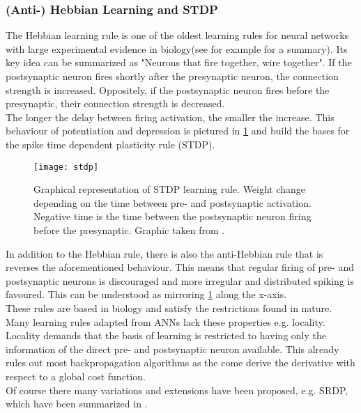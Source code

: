 \subsubsection{(Anti-) Hebbian Learning and STDP}
The Hebbian learning rule is one of the oldest learning rules for neural networks with large experimental evidence in biology(see for example \cite{feldman_spike-timing_2012} for a summary). Its key idea can be summarized as "Neurons that fire together, wire together". If the postsynaptic neuron fires shortly after the presynaptic neuron, the connection strength is increased. Oppositely, if the postsynaptic neuron fires before the presynaptic, their connection strength is decreased.\\
The longer the delay between firing activation, the smaller the increase. This behaviour of potentiation and depression is pictured in \cref{fig:stdp} and build the bases for the spike time dependent plasticity rule (STDP).
\begin{figure}
	\centering
	\texttt{[image: stdp]}
	\caption{Graphical representation of STDP learning rule. Weight change depending on the time between pre- and postsynaptic activation. Negative time is the time between the postsynaptic neuron firing before the presynaptic. Graphic taken from \cite{yi_learning_2023}.}
	\label{fig:stdp}
\end{figure}
In addition to the Hebbian rule, there is also the anti-Hebbian rule that is reverses the aforementioned behaviour. This means that regular firing of pre- and postsynaptic neurons is discouraged and more irregular and distributed spiking is favoured. This can be understood as mirroring \cref{fig:stdp} along the x-axis.\\

These rules are based in biology and satisfy the restrictions found in nature. Many learning rules adapted from \acp{ANN} lack these properties e.g. locality. Locality demands that the basis of learning is restricted to having only the information of the direct pre- and postsynaptic neuron available. This already rules out most backpropagation algorithms as the come derive the derivative with respect to a global cost function.\\

Of course there many variations and extensions have been proposed, e.g. \ac{SRDP}\cite{kempter_hebbian_1999}, which have been summarized in  \cite{yi_learning_2023}.

